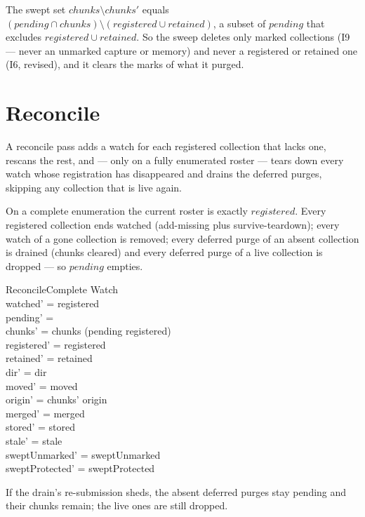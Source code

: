 \documentclass[a4paper]{article}
\begin{document}
The swept set $chunks \setminus chunks'$ equals $(pending \cap chunks) \setminus
(registered \cup retained)$, a subset of $pending$ that excludes $registered \cup
retained$.  So the sweep deletes only marked collections (I9 --- never an
unmarked capture or memory) and never a registered or retained one (I6, revised),
and it clears the marks of what it purged.

\section{Reconcile}

A reconcile pass adds a watch for each registered collection that lacks one,
rescans the rest, and --- only on a fully enumerated roster --- tears down every
watch whose registration has disappeared and drains the deferred purges,
skipping any collection that is live again.

On a complete enumeration the current roster is exactly $registered$.  Every
registered collection ends watched (add-missing plus survive-teardown); every
watch of a gone collection is removed; every deferred purge of an absent
collection is drained (chunks cleared) and every deferred purge of a live
collection is dropped --- so $pending$ empties.

\begin{schema}{ReconcileComplete}
  \Delta Watch \\
  \where
  watched' = registered \\
  pending' = \emptyset \\
  chunks' = chunks \setminus (pending \setminus registered) \\
  registered' = registered \\
  retained' = retained \\
  dir' = dir \\
  moved' = moved \\
  origin' = chunks' \dres origin \\
  merged' = merged \\
  stored' = stored \\
  stale' = stale \\
  sweptUnmarked' = sweptUnmarked \\
  sweptProtected' = sweptProtected
\end{schema}

If the drain's re-submission sheds, the absent deferred purges stay pending and
their chunks remain; the live ones are still dropped.
\end{document}
